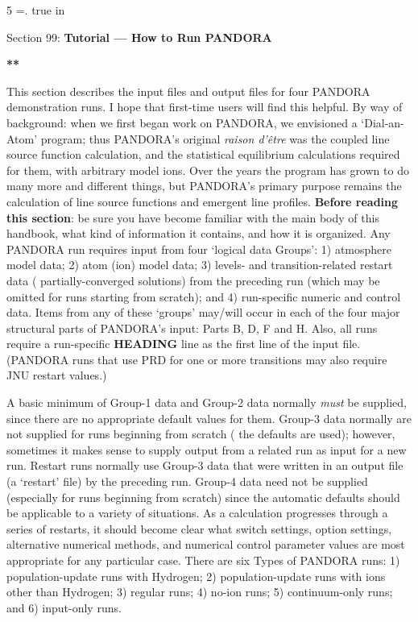 5
\newtoks\footline \footline={\hss{}.\folio\hss}
\top
{}
 true in
\centerline{Section 99: {\bf Tutorial --- How to Run PANDORA}}
\blankline
\blankline
\centerline{\bf ***}
\blankline
\blankline
This section describes the input files and output files for four PANDORA
demonstration runs. I hope that first-time users will find this helpful.
By way of background: when we first began work on PANDORA, we envisioned 
a `Dial-an-Atom' program; thus PANDORA's original {\it raison d'\^etre} was
the coupled line source function calculation, and the statistical equilibrium
calculations required for them, with arbitrary model ions. Over the years
the program has grown to do many more and different things, but PANDORA's
primary purpose remains the calculation of line source functions and
emergent line profiles.
{\bf Before reading this section}: be sure you have become familiar with
the main body of this handbook, what kind of information it contains,
and how it is organized.
\blankline
\blankline
Any PANDORA run requires input from four `logical data Groups':
1) atmosphere model data;
2) atom (ion) model data; 3) levels- and transition-related restart data 
({\ie} partially-converged solutions) from the preceding run (which may be
omitted for runs starting from scratch); and 4) run-specific numeric and control
data. Items from any of these `groups' may/will occur in each of the
four major structural parts of PANDORA's input: Parts B, D, F and H.
Also, all runs require a run-specific {\bf HEADING} line as the first
line of the input file. \break (PANDORA runs that use PRD for one or more
transitions may also require \break JNU restart values.)

A basic minimum of Group-1 data and Group-2 data normally {\it must} be
supplied, since there are no appropriate default values for them.
Group-3 data normally are not supplied for runs beginning from scratch
({\ie} the defaults are used); however, sometimes
it makes sense to supply output from a related run as input for a new run.
Restart runs normally use Group-3 data that were written in an
output file (a `restart' file) by the preceding run.
Group-4 data need not be supplied (especially for runs beginning
from scratch) since the automatic defaults should be applicable to a
variety of situations. As a calculation progresses through a series of restarts,
it should become clear what switch settings, option settings,
alternative numerical methods,
and numerical control parameter values are most appropriate for any
particular case.
\blankline
There are six Types of PANDORA runs: 1) population-update runs with Hydrogen;
2) population-update runs with ions other than Hydrogen; 3) regular runs;
4) no-ion runs; 5) continuum-only runs; and 6) input-only runs. 


